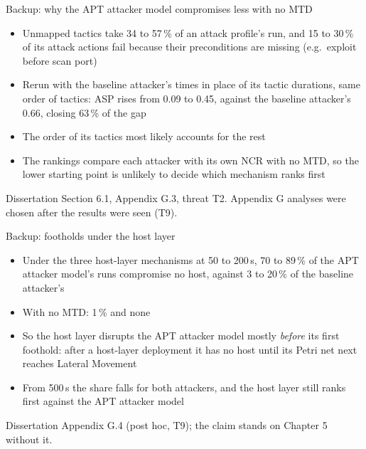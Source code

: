 \documentclass[aspectratio=169,11pt]{beamer}
\begin{document}
\appendix
{}

\begin{frame}{Backup: why the APT attacker model compromises less with no MTD}
\begin{itemize}
  \item Unmapped tactics take 34 to 57\,\% of an attack profile's run, and 15 to 30\,\% of its attack actions fail because their preconditions are missing (e.g.\ exploit before scan port)
  \item Rerun with the baseline attacker's times in place of its tactic durations, same order of tactics: ASP rises from 0.09 to 0.45, against the baseline attacker's 0.66, closing 63\,\% of the gap
  \item The order of its tactics most likely accounts for the rest
  \item The rankings compare each attacker with its own NCR with no MTD, so the lower starting point is unlikely to decide which mechanism ranks first
\end{itemize}
\vfill{\scriptsize Dissertation Section 6.1, Appendix G.3, threat T2. Appendix G analyses were chosen after the results were seen (T9).}
\end{frame}

\begin{frame}{Backup: footholds under the host layer}
\begin{itemize}
  \item Under the three host-layer mechanisms at 50 to 200\,s, 70 to 89\,\% of the APT attacker model's runs compromise no host, against 3 to 20\,\% of the baseline attacker's
  \item With no MTD: 1\,\% and none
  \item So the host layer disrupts the APT attacker model mostly \emph{before} its first foothold: after a host-layer deployment it has no host until its Petri net next reaches Lateral Movement
  \item From 500\,s the share falls for both attackers, and the host layer still ranks first against the APT attacker model
\end{itemize}
\vfill{\scriptsize Dissertation Appendix G.4 (post hoc, T9); the claim stands on Chapter 5 without it.}
\end{frame}
\end{document}
